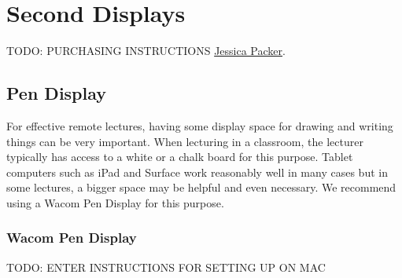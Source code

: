 \chapter{Second Displays}
\label{ch:displays}

\begin{gram}
\label{grm:displays::preamble}
TODO: PURCHASING INSTRUCTIONS
\href{mailto:jpacker@andrew.cmu.edu}{Jessica Packer}.
%
\end{gram}


\section{Pen Display}

For effective remote lectures, having some display space for drawing and writing things can be very important.  When lecturing in a classroom, the lecturer typically has access to a white or a chalk  board for this purpose.  
%
Tablet computers such as iPad and Surface work reasonably well in many cases but in some lectures, a bigger space may be helpful and even necessary. 
%
We recommend using a Wacom Pen Display for this purpose.

\subsection{Wacom Pen Display}
\label{sec:displays::wacom}


\begin{gram}
\label{grm:displays::wacom::16::mac-setup}

TODO: ENTER INSTRUCTIONS FOR SETTING UP ON MAC
\end{gram}


